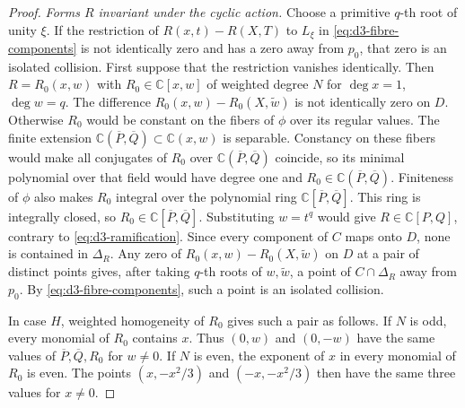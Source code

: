\documentclass[11pt,letterpaper]{article}
\numberwithin{equation}{section}
\theoremstyle{remark}
\theoremstyle{plain}
\newcommand{\C}{\mathbb{C}}
\begin{document}
\begin{proof}
\smallskip
\noindent\emph{Forms $R$ invariant under the cyclic action.}
Choose a primitive $q$-th root of unity $\xi$.  If the restriction of
$R(x,t)-R(X,T)$ to $L_\xi$ in \eqref{eq:d3-fibre-components} is
not identically zero and has a zero away from $p_0$, that zero is an isolated
collision.  First suppose that the restriction vanishes
identically.  Then $R=R_0(x,w)$ with $R_0\in\C[x,w]$ of weighted
degree $N$ for $\deg x=1$, $\deg w=q$.
The difference $R_0(x,w)-R_0(X,\widetilde w)$ is not identically zero
on $D$.  Otherwise $R_0$ would be constant on the fibers of $\phi$
over its regular values.  The finite extension
$\C(\overline P,\overline Q)\subset\C(x,w)$ is separable.
Constancy on these fibers would make all conjugates of $R_0$
over $\C(\overline P,\overline Q)$ coincide, so its minimal polynomial
over that field would have degree one and
$R_0\in\C(\overline P,\overline Q)$.
Finiteness of $\phi$ also makes $R_0$ integral over the polynomial
ring $\C[\overline P,\overline Q]$.  This ring is integrally
closed, so $R_0\in\C[\overline P,\overline Q]$.  Substituting
$w=t^q$ would give $R\in\C[P,Q]$, contrary to
\eqref{eq:d3-ramification}.
Since every component of $C$ maps onto $D$, none is contained
in $\Delta_R$.  Any zero of $R_0(x,w)-R_0(X,\widetilde w)$ on $D$
at a pair of distinct points gives, after taking $q$-th roots of
$w,\widetilde w$,
a point of $C\cap\Delta_R$ away from $p_0$.
By \eqref{eq:d3-fibre-components}, such a point is an isolated
collision.

In case $H$, weighted homogeneity of $R_0$ gives such a pair
as follows.  If $N$ is odd, every monomial of $R_0$ contains $x$.
Thus $(0,w)$ and $(0,-w)$ have the same values of
$\overline P,\overline Q,R_0$ for $w\neq0$.
If $N$ is even, the exponent of $x$ in every monomial of $R_0$ is even.
The points $(x,-x^2/3)$ and $(-x,-x^2/3)$ then have the same
three values for $x\neq0$.


\end{proof}
\end{document}
